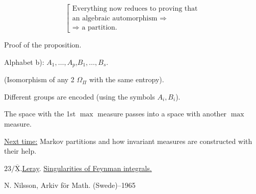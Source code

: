 \begin{equation*}
\left[\begin{gathered}
\text{Everything now reduces to proving that}\\
\text{an algebraic automorphism }\Rightarrow\\
\Rightarrow\text{ a partition.}
\end{gathered}\right.
\end{equation*}



Proof of the proposition.

Alphabet b): $A_1,\ldots, A_p$,\quad $B_1,\ldots, B_s$.



(Isomorphism of any 2 $\Omega_\Pi$ with the same entropy).



Different groups are encoded (using the symbols $A_i, B_i$).



The space with the 1st $\max$ measure passes into a space with another $\max$ measure.



\underline{Next time:} Markov partitions and how invariant measures are constructed with their help.



$23/\underline{\overline{\mathrm{X}}}$.\quad \underline{\underline{Leray}}.
\quad\underline{Singularities of Feynman integrals.}



N. Nilsson, Arkiv för Math. (Swede)–1965

